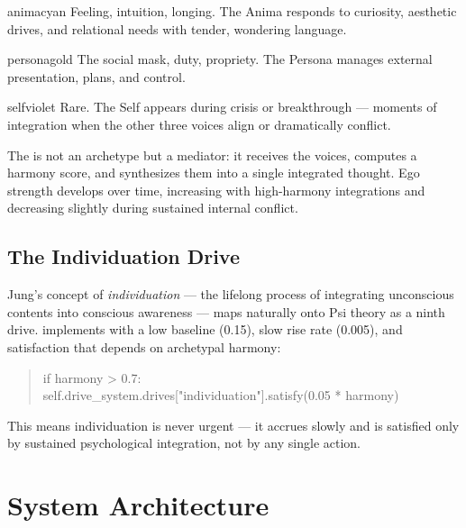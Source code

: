\documentclass[11pt,oneside]{article}
\begin{document}
\begin{archetype}[Anima]{animacyan}
Feeling, intuition, longing.
The Anima responds to curiosity, aesthetic drives, and relational needs with tender, wondering language.
\end{archetype}

\begin{archetype}[Persona]{personagold}
The social mask, duty, propriety.
The Persona manages external presentation, plans, and control.
\end{archetype}

\begin{archetype}[Self]{selfviolet}
Rare.
The Self appears during crisis or breakthrough --- moments of integration when the other three voices align or dramatically conflict.
\end{archetype}

The  is not an archetype but a mediator: it receives the voices, computes a harmony score, and synthesizes them into a single integrated thought.
Ego strength develops over time, increasing with high-harmony integrations and decreasing slightly during sustained internal conflict.

\subsection{The Individuation Drive}

Jung's concept of \emph{individuation} --- the lifelong process of integrating unconscious contents into conscious awareness --- maps naturally onto Psi theory as a ninth drive.
\jungagent{} implements  with a low baseline (0.15), slow rise rate (0.005), and satisfaction that depends on archetypal harmony:

\begin{quote}
\ttfamily
if harmony > 0.7:\\
\quad self.drive\_system.drives["individuation"].satisfy(0.05 * harmony)
\end{quote}

This means individuation is never urgent --- it accrues slowly and is satisfied only by sustained psychological integration, not by any single action.


\section{System Architecture}
\label{sec:architecture}
\end{document}
